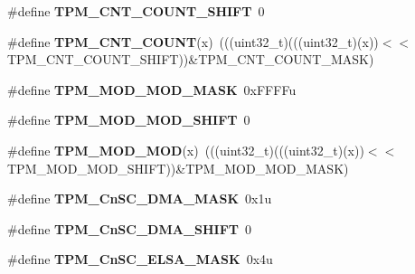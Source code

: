 \begin{DoxyCompactItemize}
\mbox{\label{group___t_p_m___register___masks_gabc68cb7f4dfd853021c35f9cad5b05e2}} 
\#define {\bfseries T\+P\+M\+\_\+\+C\+N\+T\+\_\+\+C\+O\+U\+N\+T\+\_\+\+S\+H\+I\+FT}~0
\item 
\mbox{\label{group___t_p_m___register___masks_ga5b121b9bc3cc5527202fc0e64eae37fd}} 
\#define {\bfseries T\+P\+M\+\_\+\+C\+N\+T\+\_\+\+C\+O\+U\+NT}(x)~(((uint32\+\_\+t)(((uint32\+\_\+t)(x))$<$$<$T\+P\+M\+\_\+\+C\+N\+T\+\_\+\+C\+O\+U\+N\+T\+\_\+\+S\+H\+I\+FT))\&T\+P\+M\+\_\+\+C\+N\+T\+\_\+\+C\+O\+U\+N\+T\+\_\+\+M\+A\+SK)
\item 
\mbox{\label{group___t_p_m___register___masks_ga547f0f1f80a59cf7a5c19b6e5ee66055}} 
\#define {\bfseries T\+P\+M\+\_\+\+M\+O\+D\+\_\+\+M\+O\+D\+\_\+\+M\+A\+SK}~0x\+F\+F\+F\+Fu
\item 
\mbox{\label{group___t_p_m___register___masks_gad3b8c1cb94d29448d0eef30e94d65299}} 
\#define {\bfseries T\+P\+M\+\_\+\+M\+O\+D\+\_\+\+M\+O\+D\+\_\+\+S\+H\+I\+FT}~0
\item 
\mbox{\label{group___t_p_m___register___masks_ga5bbadc84c3e752cd934747b91cdaf426}} 
\#define {\bfseries T\+P\+M\+\_\+\+M\+O\+D\+\_\+\+M\+OD}(x)~(((uint32\+\_\+t)(((uint32\+\_\+t)(x))$<$$<$T\+P\+M\+\_\+\+M\+O\+D\+\_\+\+M\+O\+D\+\_\+\+S\+H\+I\+FT))\&T\+P\+M\+\_\+\+M\+O\+D\+\_\+\+M\+O\+D\+\_\+\+M\+A\+SK)
\item 
\mbox{\label{group___t_p_m___register___masks_ga22ac77707a11ee299dc16d5a6b738739}} 
\#define {\bfseries T\+P\+M\+\_\+\+Cn\+S\+C\+\_\+\+D\+M\+A\+\_\+\+M\+A\+SK}~0x1u
\item 
\mbox{\label{group___t_p_m___register___masks_ga368e054056cb1a0c32a9b3493e4c5871}} 
\#define {\bfseries T\+P\+M\+\_\+\+Cn\+S\+C\+\_\+\+D\+M\+A\+\_\+\+S\+H\+I\+FT}~0
\item 
\mbox{\label{group___t_p_m___register___masks_ga2e5b9e774ab4f1ad012602f399949dbf}} 
\#define {\bfseries T\+P\+M\+\_\+\+Cn\+S\+C\+\_\+\+E\+L\+S\+A\+\_\+\+M\+A\+SK}~0x4u

\end{DoxyCompactItemize}
